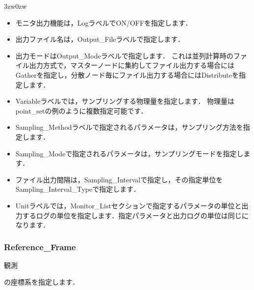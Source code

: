\begin{indentation}{3zw}{0zw}
\begin{itemize}
\item モニタ出力機能は，LogラベルでON/OFFを指定します．
\item 出力ファイル名は，Output\_Fileラベルで指定します．
\item 出力モードはOutput\_Modeラベルで指定します．
これは並列計算時のファイル出力方式で，マスターノードに集約してファイル出力する場合にはGatherを指定し，分散ノード毎にファイル出力する場合にはDistributeを指定します．
\item Variableラベルでは，サンプリングする物理量を指定します．
物理量はpoint\_setの例のように複数指定可能です．
\item Sampling\_Methodラベルで指定されるパラメータは，サンプリング方法を指定します．
\item Sampling\_Modeで指定されるパラメータは，サンプリングモードを指定します．
\item ファイル出力間隔は，Sampling\_Intervalで指定し，その指定単位をSampling\_Interval\_Typeで指定します．
\item Unitラベルでは，Monitor\_Listセクションで指定するパラメータの単位と出力するログの単位を指定します．指定パラメータと出力ログの単位は同じになります．
\end{itemize}

\end{indentation}




\pagebreak
\subsubsection{Reference\_Frame}

\hypertarget{tgt:reference_frame}{観測}の座標系を指定します．

